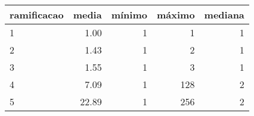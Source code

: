 \begin{table}[ht]
\centering
\begin{tabular}{lrrrr}
  \hline
ramificacao & media & mínimo & máximo & mediana \\ 
  \hline
1 & 1.00 &   1 &   1 &   1 \\ 
  2 & 1.43 &   1 &   2 &   1 \\ 
  3 & 1.55 &   1 &   3 &   1 \\ 
  4 & 7.09 &   1 & 128 &   2 \\ 
  5 & 22.89 &   1 & 256 &   2 \\ 
   \hline
\end{tabular}
\end{table}
